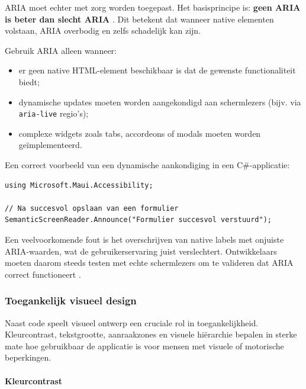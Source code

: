 ARIA moet echter met zorg worden toegepast. Het basisprincipe is: \textbf{geen ARIA is beter dan slecht ARIA} \autocite{MDN_Accessibility_nodate}. Dit betekent dat wanneer native elementen volstaan, ARIA overbodig en zelfs schadelijk kan zijn.

Gebruik ARIA alleen wanneer:

\begin{itemize}
    \item er geen native HTML-element beschikbaar is dat de gewenste functionaliteit biedt;
    \item dynamische updates moeten worden aangekondigd aan schermlezers (bijv. via \texttt{aria-live} regio's);
    \item complexe widgets zoals tabs, accordeons of modals moeten worden geïmplementeerd.
\end{itemize}

Een correct voorbeeld van een dynamische aankondiging in een C\#-applicatie:

\begin{listing}[H]
\begin{verbatim}
using Microsoft.Maui.Accessibility;

// Na succesvol opslaan van een formulier
SemanticScreenReader.Announce("Formulier succesvol verstuurd");
\end{verbatim}
\caption{Dynamische aankondiging via \texttt{SemanticScreenReader.Announce()} voor schermlezers.}
\label{lst:aria-live}
\end{listing}

Een veelvoorkomende fout is het overschrijven van native labels met onjuiste ARIA-waarden, wat de gebruikerservaring juist verslechtert. Ontwikkelaars moeten daarom steeds testen met echte schermlezers om te valideren dat ARIA correct functioneert \autocite{Kramer2026}.

\subsubsection{Toegankelijk visueel design}
\label{subsubsec:toegankelijk-design}

Naast code speelt visueel ontwerp een cruciale rol in toegankelijkheid. Kleurcontrast, tekstgrootte, aanraakzones en visuele hiërarchie bepalen in sterke mate hoe gebruikbaar de applicatie is voor mensen met visuele of motorische beperkingen.

\paragraph{Kleurcontrast}

